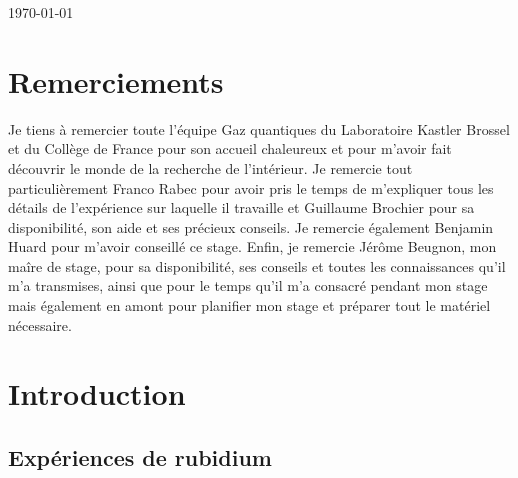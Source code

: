 \documentclass[11pt,a4paper]{article}
\begin{document}
\begin{@empty}
\begin{center}
\end{center}

\vspace{-0.2cm}

\vfill
\hfill \today

\end{@empty}

\newpage

\thispagestyle{empty}
\section*{Remerciements}

Je tiens à remercier toute l'équipe Gaz quantiques du Laboratoire Kastler Brossel et du Collège de France pour son accueil chaleureux et pour m'avoir fait découvrir le monde de la recherche de l'intérieur. Je remercie tout particulièrement Franco Rabec pour avoir pris le temps de m'expliquer tous les détails de l'expérience sur laquelle il travaille et Guillaume Brochier pour sa disponibilité, son aide et ses précieux conseils. Je remercie également Benjamin Huard pour m'avoir conseillé ce stage. Enfin, je remercie Jérôme Beugnon, mon maîre de stage, pour sa disponibilité, ses conseils et toutes les connaissances qu'il m'a transmises, ainsi que pour le temps qu'il m'a consacré pendant mon stage mais également en amont pour planifier mon stage et préparer tout le matériel nécessaire. 
\tableofcontents
\newpage


\setcounter{page}{1}


\setlength{\parindent}{16pt}

\section{Introduction}


\subsection{Expériences de rubidium}

\end{document}

